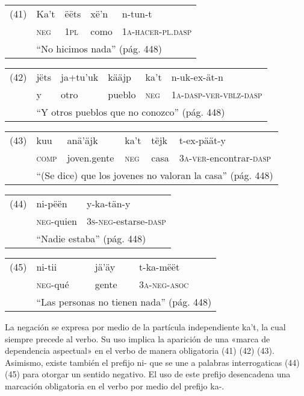 {\setmainfont{Doulos SIL} 

\begin{tabular}{lllll}
(41) & Ka't & ëëts & xë'n & n-tun-t \\
& \textsc{neg} & \textsc{1pl} & como & \textsc{1a-hacer-pl.dasp} \\
& \multicolumn{4}{l}{``No hicimos nada'' (pág. 448)}
\end{tabular} \vspace{0.5cm}

\begin{tabular}{llllll}
(42) & jëts & ja+tu'uk & kääjp & ka't & n-uk-ex-ät-n \\
& y & otro & pueblo & \textsc{neg} & \textsc{1a-dasp-ver-vblz-dasp} \\
& \multicolumn{5}{l}{``Y otros pueblos que no conozco'' (pág. 448)}
\end{tabular} \vspace{0.5cm}

\begin{tabular}{llllll}
(43) & kuu & anä'äjk & ka't & tëjk & t-ex-päät-y \\
& \textsc{comp} & joven.gente & \textsc{neg} & casa & \textsc{3a-ver}-encontrar-\textsc{dasp} \\
& \multicolumn{5}{l}{``(Se dice) que los jovenes no valoran la casa'' (pág. 448)}
\end{tabular} \vspace{0.5cm}

\begin{tabular}{lll}
(44) & ni-pëën & y-ka-tän-y \\
& \textsc{neg}-quien & \textsc{3s-neg}-estarse-\textsc{dasp} \\
& \multicolumn{2}{l}{``Nadie estaba'' (pág. 448)}
\end{tabular} \vspace{0.5cm}

\begin{tabular}{llll}
(45) & ni-tii & jä'äy & t-ka-mëët \\
& \textsc{neg}-qué & gente & \textsc{3a-neg-asoc} \\
& \multicolumn{3}{l}{``Las personas no tienen nada'' (pág. 448)}
\end{tabular} \vspace{0.5cm}
}

La negación se expresa por medio de la partícula independiente {\setmainfont{Doulos SIL} ka't}, la cual siempre precede al verbo. Su uso implica la aparición de una «marca de dependencia aspectual» \textcolor{MidnightBlue}{\citep{mixe}} en el verbo de manera obligatoria (41) (42) (43). Asimismo, existe también el prefijo {\setmainfont{Doulos SIL} ni-} que se une a palabras interrogaticas (44) (45) para otorgar un sentido negativo. El uso de este prefijo desencadena una marcación obligatoria en el verbo por medio del prefijo {\setmainfont{Doulos SIL} ka-}.